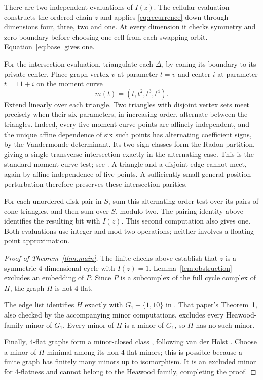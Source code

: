 \documentclass[11pt]{article}
\begin{document}
There are two independent evaluations of $I(z)$. The cellular
evaluation constructs the ordered chain $z$ and applies
\eqref{eq:recurrence} down through dimensions four, three, two and one.
At every dimension it checks symmetry and zero boundary before choosing
one cell from each swapping orbit. Equation~\eqref{eq:base} gives one.

For the intersection evaluation, triangulate each $\Delta_i$ by coning its
boundary to its private center. Place graph vertex $v$ at parameter
$t=v$ and center $i$ at parameter $t=11+i$ on the moment curve
\[
m(t)=(t,t^2,t^3,t^4).
\]
Extend linearly over each triangle.
Two triangles with disjoint vertex sets meet precisely when their six
parameters, in increasing order, alternate between the triangles.
Indeed, every five moment-curve points are affinely independent,
and the unique affine dependence of six such points has alternating
coefficient signs, by the Vandermonde determinant. Its two sign classes
form the Radon partition, giving a single transverse intersection
exactly in the alternating case. This is the standard moment-curve
test; see \cite[Lemma D.2]{MTW}. A triangle and a disjoint edge cannot
meet, again by affine independence of five points.
A sufficiently small general-position perturbation therefore preserves
these intersection parities.

For each unordered disk pair in $S$, sum this alternating-order test
over its pairs of cone triangles, and then sum over $S$, modulo two.
The pairing identity above identifies the resulting bit with $I(z)$.
This second computation also gives one. Both evaluations use integer and mod-two operations;
neither involves a floating-point approximation.

\begin{proof}[Proof of Theorem~\ref{thm:main}]
The finite checks above establish that $z$ is a symmetric 4-dimensional cycle
with $I(z)=1$. Lemma~\ref{lem:obstruction} excludes an embedding of $P$.
Since $P$ is a subcomplex of the full cycle complex of $H$, the graph
$H$ is not 4-flat.

The edge list identifies $H$ exactly with $G_1-\{1,10\}$ in
\cite{Graham}. That paper's Theorem~1, also checked by the accompanying
minor computations, excludes every Heawood-family minor of $G_1$.
Every minor of $H$ is a minor of $G_1$, so $H$ has no such minor.

Finally, 4-flat graphs form a minor-closed class
\cite[\S1.1]{GW}, following van der Holst \cite{vdH}. Choose a minor of $H$ minimal among its non-4-flat
minors; this is possible because a finite graph has finitely many
minors up to isomorphism. It is an excluded minor for 4-flatness and
cannot belong to the Heawood family, completing the proof.
\end{proof}
\end{document}

